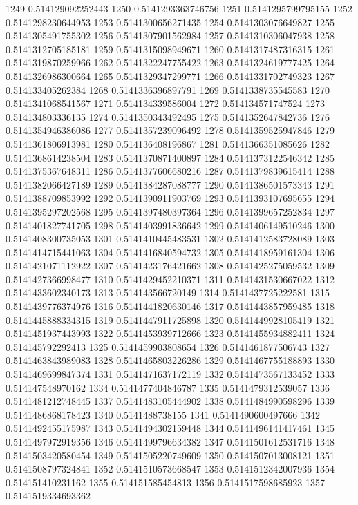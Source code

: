 1249 0.514129092252443
1250 0.5141293363746756
1251 0.5141295799795155
1252 0.5141298230644953
1253 0.5141300656271435
1254 0.5141303076649827
1255 0.5141305491755302
1256 0.5141307901562984
1257 0.5141310306047938
1258 0.5141312705185181
1259 0.5141315098949671
1260 0.5141317487316315
1261 0.5141319870259966
1262 0.5141322247755422
1263 0.5141324619777425
1264 0.5141326986300664
1265 0.5141329347299771
1266 0.5141331702749323
1267 0.514133405262384
1268 0.5141336396897791
1269 0.5141338735545583
1270 0.5141341068541567
1271 0.514134339586004
1272 0.514134571747524
1273 0.514134803336135
1274 0.5141350343492495
1275 0.5141352647842736
1276 0.5141354946386086
1277 0.5141357239096492
1278 0.5141359525947846
1279 0.5141361806913981
1280 0.514136408196867
1281 0.5141366351085626
1282 0.5141368614238504
1283 0.5141370871400897
1284 0.5141373122546342
1285 0.5141375367648311
1286 0.5141377606680216
1287 0.5141379839615414
1288 0.5141382066427189
1289 0.5141384287088777
1290 0.5141386501573343
1291 0.5141388709853992
1292 0.5141390911903769
1293 0.5141393107695655
1294 0.5141395297202568
1295 0.5141397480397364
1296 0.5141399657252834
1297 0.5141401827741705
1298 0.5141403991836642
1299 0.5141406149510246
1300 0.5141408300735053
1301 0.5141410445483531
1302 0.5141412583728089
1303 0.5141414715441063
1304 0.5141416840594732
1305 0.5141418959161304
1306 0.5141421071112922
1307 0.5141423176421662
1308 0.5141425275059532
1309 0.5141427366998477
1310 0.5141429452210371
1311 0.5141431530667022
1312 0.5141433602340173
1313 0.514143566720149
1314 0.5141437725222581
1315 0.5141439776374976
1316 0.5141441820630146
1317 0.5141443857959485
1318 0.5141445888334315
1319 0.5141447911725898
1320 0.5141449928105419
1321 0.5141451937443993
1322 0.5141453939712666
1323 0.5141455934882411
1324 0.514145792292413
1325 0.5141459903808654
1326 0.5141461877506743
1327 0.5141463843989083
1328 0.5141465803226286
1329 0.5141467755188893
1330 0.5141469699847374
1331 0.5141471637172119
1332 0.5141473567133452
1333 0.514147548970162
1334 0.5141477404846787
1335 0.5141479312539057
1336 0.5141481212748445
1337 0.5141483105444902
1338 0.5141484990598296
1339 0.5141486868178423
1340 0.5141488738155
1341 0.5141490600497666
1342 0.5141492455175987
1343 0.5141494302159448
1344 0.5141496141417461
1345 0.5141497972919356
1346 0.5141499796634382
1347 0.5141501612531716
1348 0.5141503420580454
1349 0.5141505220749609
1350 0.5141507013008121
1351 0.5141508797324841
1352 0.5141510573668547
1353 0.5141512342007936
1354 0.514151410231162
1355 0.514151585454813
1356 0.5141517598685923
1357 0.5141519334693362
